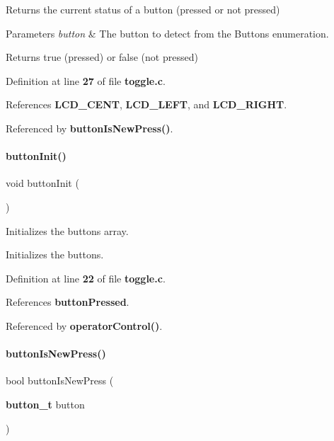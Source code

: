Returns the current status of a button (pressed or not pressed) 


\begin{DoxyParams}{Parameters}
{\em button} & The button to detect from the Buttons enumeration.\\
\hline
\end{DoxyParams}
\begin{DoxyReturn}{Returns}
true (pressed) or false (not pressed) 
\end{DoxyReturn}


Definition at line \textbf{ 27} of file \textbf{ toggle.\+c}.



References \textbf{ L\+C\+D\+\_\+\+C\+E\+NT}, \textbf{ L\+C\+D\+\_\+\+L\+E\+FT}, and \textbf{ L\+C\+D\+\_\+\+R\+I\+G\+HT}.



Referenced by \textbf{ button\+Is\+New\+Press()}.

\mbox{\label{toggle_8c_a2b3d226371575c894979ab84bce95626}} 
\paragraph{button\+Init()}
{\footnotesize\ttfamily void button\+Init (\begin{DoxyParamCaption}{ }\end{DoxyParamCaption})}



Initializes the buttons array. 

Initializes the buttons. 

Definition at line \textbf{ 22} of file \textbf{ toggle.\+c}.



References \textbf{ button\+Pressed}.



Referenced by \textbf{ operator\+Control()}.

\mbox{\label{toggle_8c_a07c56bf50097f5bf35c5e8c9067800e1}} 
\paragraph{button\+Is\+New\+Press()}
{\footnotesize\ttfamily bool button\+Is\+New\+Press (\begin{DoxyParamCaption}\item[{\textbf{ button\+\_\+t}}]{button }\end{DoxyParamCaption})}



